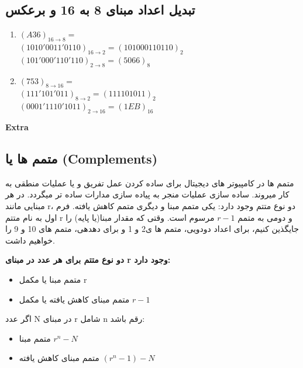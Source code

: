 \documentclass[pt, a5paper]{article}
\begin{document}
\subsection{تبدیل اعداد مبنای 8 به 16 و برعکس}


\begin{enumerate}\raggedright
	\item
	$(A36)_{16 \rightarrow 8} = $\\
	$(1010'0011'0110)_{16 \rightarrow 2} = (101000110110)_{2} $\\
	$(101'000'110'110)_{2 \rightarrow 8} = (5066)_{8} $\\
	
	\item
	$(753)_{8 \rightarrow 16} = $\\
	$(111'101'011)_{8 \rightarrow 2} = (111101011)_{2} $\\
	$(0001'1110'1011)_{2 \rightarrow 16} = (1EB)_{16} $\\
\end{enumerate}

\textbf{Extra}\\








\subsection{متمم ها یا (Complements)}

متمم ها در کامپیوتر های دیجیتال برای ساده کردن عمل تفریق و یا عملیات منطقی به کار میروند. ساده سازی عملیات منجر به پیاده سازی مدارات ساده تر میگردد. در هر مبنایی مانند r، دو نوع متتم وجود دارد: یکی متمم مبنا و دیگری متمم کاهش یافته. فرم اول به نام متتم r و دومی به متمم
$r - 1$
مرسوم است. وقتی که مقدار مبنا(یا پایه) را جایگذین کنیم، برای اعداد دودویی، متمم ها ی2 و 1 و برای دهدهی، متمم های 10 و 9 را خواهیم داشت.

\textbf{دو نوع متتم برای هر عدد در مبنای r وجود دارد:}
\begin{itemize}
	\item
متمم مبنا یا مکمل r
	\item
	متمم مبنای کاهش یافته یا مکمل $r - 1$
\end{itemize}

اگر عدد N در مبنای r شامل n رقم باشد:\\
\begin{itemize}
	\item
	 متمم مبنا
	 $r^{n}-N$
	\item
	متمم مبنای کاهش یافته
	$(r^{n} - 1) - N$
\end{itemize}
\end{document}
